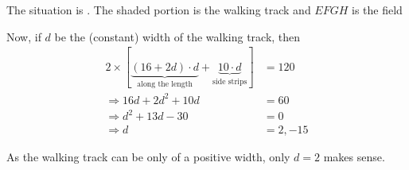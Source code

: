 \begin{solution}
  The situation is \asif. The shaded portion is the walking track and $EFGH$ is the field

  Now, if $d$ be the (constant) width of the walking track, then
  \begin{align}
  	2\times\left[\underbrace{(16+2d)\cdot d}_{\text{along the length}} + 
  	\underbrace{10\cdot d}_{\text{side strips}} \right] &= 120 \\
  	\Rightarrow 16d + 2d^2 + 10d &= 60 \\
  	\Rightarrow d^2 + 13d - 30 &= 0 \\
  	\Rightarrow d &= 2, -15
  \end{align}
  
  As the walking track  can be only of a positive width, only $d = 2$ makes sense. 
\end{solution}

